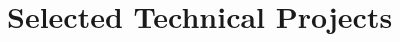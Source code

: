 \documentclass[10pt,letterpaper,sans]{moderncv}        %
\newcommand\x{1}
\begin{document}





\section{Selected Technical Projects}
\vspace{\x pt}




\end{document}
